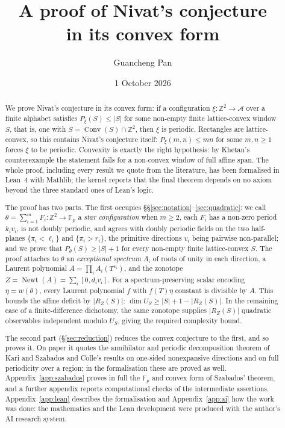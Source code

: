 \documentclass[11pt,reqno]{amsart}
\title[A proof of Nivat's conjecture in its convex form]
      {A proof of Nivat's conjecture\\
       in its convex form}
\author[G. Pan]{Guancheng Pan}
\date{1 October 2026}
\theoremstyle{plain}
\theoremstyle{definition}
\theoremstyle{remark}
\theoremstyle{plain}
\theoremstyle{remark}
\theoremstyle{definition}
\numberwithin{equation}{section}
\DeclareMathOperator{\Conv}{Conv}
\DeclareMathOperator{\Newt}{Newt}
\newcommand{\Z}{\mathbb{Z}}
\newcommand{\Fp}{\mathbb{F}_p}
\newcommand{\cA}{\mathcal{A}}
\begin{document}
\begin{abstract}
We prove Nivat's conjecture in its convex form: if a configuration
$\xi\colon\Z^2\to\cA$ over a finite alphabet satisfies $P_\xi(S)\le|S|$ for
some non-empty finite lattice-convex window $S$, that is, one with
$S=\Conv(S)\cap\Z^2$, then $\xi$ is periodic.  Rectangles are lattice-convex,
so this contains Nivat's conjecture itself: $P_\xi(m,n)\le mn$ for some
$m,n\ge1$ forces $\xi$ to be periodic.  Convexity is exactly the right hypothesis:
by Khetan's counterexample the statement fails for a non-convex window of
full affine span.
The whole proof, including every result we quote from the literature, has been
formalised in Lean~4 with Mathlib; the kernel reports that the final theorem
depends on no axiom beyond the three standard ones of Lean's logic.

The proof has two parts.  The first occupies \S\S\ref{sec:notation}--\ref{sec:quadratic}: we call
$\theta=\sum_{i=1}^mF_i\colon\Z^2\to\Fp$ a \emph{star
configuration} when $m\ge2$, each $F_i$ has a non-zero period $k_iv_i$, is not doubly
periodic, and agrees with doubly periodic fields on the two half-planes
$\{\pi_i<\ell_i\}$ and $\{\pi_i>r_i\}$, the primitive directions $v_i$ being
pairwise non-parallel; and we prove that $P_\theta(S)\ge|S|+1$ for every
non-empty finite lattice-convex $S$.  The proof attaches to $\theta$ an
\emph{exceptional spectrum} $\Lambda_i$ of roots of unity in each direction, a
Laurent polynomial $A=\prod_iA_i(T^{v_i})$, and the zonotope
$Z=\Newt(A)=\sum_i[0,d_iv_i]$.  For a spectrum-preserving scalar encoding
$\eta=w(\theta)$, every Laurent polynomial $f$ with $f(T)\eta$ constant is
divisible by $A$.  This bounds the affine deficit by $|R_Z(S)|$:
$\dim U_S\ge|S|+1-|R_Z(S)|$.  In the remaining case of a finite-difference
dichotomy, the same zonotope supplies $|R_Z(S)|$ quadratic observables
independent modulo $U_S$, giving the required complexity bound.

The second part (\S\ref{sec:reduction}) reduces the convex conjecture to the
first, and so proves it.  On paper it quotes the annihilator and periodic
decomposition theorem of Kari and Szabados \cite{KS} and Colle's results
\cite{Colle23a} on one-sided nonexpansive directions and on full periodicity over
a region; in the formalisation these are proved as well.
Appendix~\ref{app:szabados} proves in full the $\Fp$ and convex form of
Szabados' theorem, and a further appendix reports computational checks of the
intermediate assertions.  Appendix~\ref{app:lean} describes the formalisation
and Appendix~\ref{app:ai} how the work was done: the mathematics and the Lean
development were produced with the author's AI research system.
\end{abstract}
\end{document}

